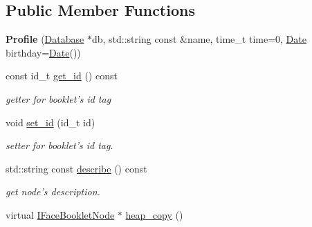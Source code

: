 \subsection*{Public Member Functions}
\begin{DoxyCompactItemize}
\item 
\hypertarget{classfb_1_1_profile_a1a203e0e22defdebb348014821664474}{{\bfseries Profile} (\hyperlink{classfb_1_1_database}{Database} $\ast$db, std\+::string const \&name, time\+\_\+t time=0, \hyperlink{structfb_1_1_date}{Date} birthday=\hyperlink{structfb_1_1_date}{Date}())}\label{classfb_1_1_profile_a1a203e0e22defdebb348014821664474}

\item 
const id\+\_\+t \hyperlink{classfb_1_1_profile_aee2df153f7923d0d5c24eb3c11dfff67}{get\+\_\+id} () const 
\begin{DoxyCompactList}\small\item\em getter for booklet's id tag \end{DoxyCompactList}\item 
void \hyperlink{classfb_1_1_profile_a8fe32885a03ac7c92675ede58a230f34}{set\+\_\+id} (id\+\_\+t id)
\begin{DoxyCompactList}\small\item\em setter for booklet's id tag. \end{DoxyCompactList}\item 
std\+::string const \hyperlink{classfb_1_1_profile_a657f6cab3f2caee6fc4b9c8758a711b3}{describe} () const 
\begin{DoxyCompactList}\small\item\em get node's description. \end{DoxyCompactList}\item 
\hypertarget{classfb_1_1_profile_a586b14f04694abe0860be3e50e6fa706}{virtual \hyperlink{structfb_1_1_i_face_booklet_node}{I\+Face\+Booklet\+Node} $\ast$ \hyperlink{classfb_1_1_profile_a586b14f04694abe0860be3e50e6fa706}{heap\+\_\+copy} ()}\label{classfb_1_1_profile_a586b14f04694abe0860be3e50e6fa706}


\end{DoxyCompactItemize}
